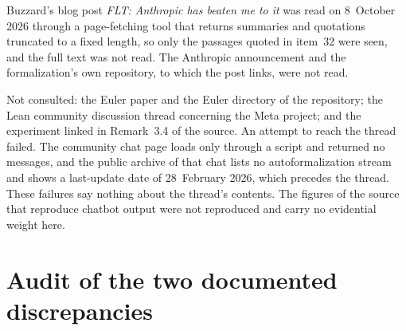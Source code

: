 Buzzard's blog post \emph{FLT: Anthropic has beaten me to it} \cite{Buzzard26} was read on 8~October 2026 through a page-fetching tool that returns summaries and quotations truncated to a fixed length, so only the passages quoted in item~32 were seen, and the full text was not read. The Anthropic announcement and the formalization's own repository, to which the post links, were not read.

Not consulted: the Euler paper and the Euler directory of the repository; the Lean community discussion thread concerning the Meta project; and the experiment linked in Remark~3.4 of the source. An attempt to reach the thread failed. The community chat page loads only through a script and returned no messages, and the public archive of that chat lists no autoformalization stream and shows a last-update date of 28~February 2026, which precedes the thread. These failures say nothing about the thread's contents. The figures of the source that reproduce chatbot output were not reproduced and carry no evidential weight here.

\section{Audit of the two documented discrepancies}

